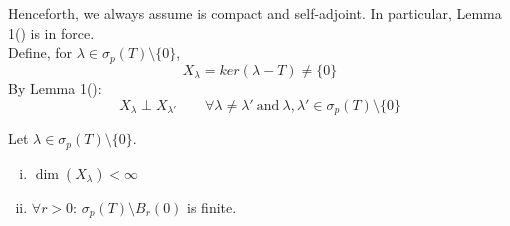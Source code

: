 \documentclass{article}
\begin{document}
Henceforth, we always assume  is compact and self-adjoint. In particular, Lemma 1() is in force.\\
Define, for $\lambda\in\sigma_p(T)\setminus\{0\}$, 
$$X_\lambda=ker(\lambda-T)\neq\{0\}$$
By  Lemma 1():
$$X_{\lambda} \perp X_{\lambda '} \qquad \forall \lambda \neq {\lambda '} \ \text{and} \ \lambda , {\lambda '} \in \sigma_p(T)\setminus\{0\}$$


\begin{lemma}[Lemma 2]\nl
\label{lemma: eigenspaces have finite dimensions for compact self-adjoint operators}
	Let $\lambda\in\sigma_p(T)\setminus\{0\}$.
	\begin{enumerate}[i)]
		\item $\dim (X_\lambda)<\infty$
		\item $\forall r>0$: $\sigma_p(T)\setminus B_r(0)$ is finite.
	\end{enumerate}
\end{lemma}
\end{document}
